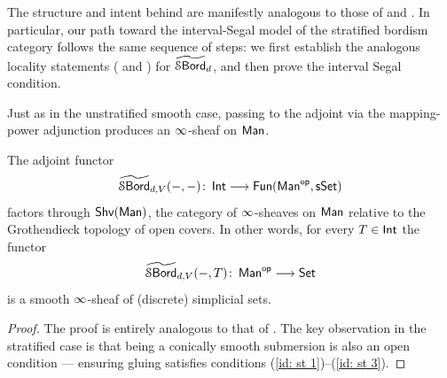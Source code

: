 \begin{observation}
    The structure and intent behind  are manifestly analogous to those of  and . In particular, our path toward the interval-Segal model of the stratified bordism category follows the same sequence of steps: we first establish the analogous locality statements ( and ) for $\operatorname{\widetilde{\mathcal S\mathsf{Bord}}}_d$, and then prove the interval Segal condition.
\end{observation}

Just as in the unstratified smooth case, passing to the adjoint via the mapping-power adjunction produces an $\operatorname{\infty}$-sheaf on $\operatorname{\sf Man}$.
\begin{proposition}\label{ch5:: prop: sheaf condition}
    The adjoint functor 
    \begin{equation}
    \operatorname{\widetilde{\mathcal S\mathsf{Bord}}}_{d,V}(-,-)\colon \operatorname{\mathsf{Int}} \longrightarrow \operatorname{{\sf Fun}}(\operatorname{\sf Man}^{\mathsf{op}},\operatorname{\sf sSet})
    \end{equation}
    factors through $\operatorname{\sf Shv}(\operatorname{\sf Man})$, the category of $\operatorname{\infty}$-sheaves on $\operatorname{\sf Man}$ relative to the Grothendieck topology of open covers. In other words, for every $T\in \operatorname{\mathsf{Int}}$ the functor
    \[
    \operatorname{\widetilde{\mathcal S\mathsf{Bord}}}_{d,V}(-,T)\colon \operatorname{\sf Man}^{\mathsf{op}}\longrightarrow \operatorname{{\mathsf{Set}}}
    \]
    is a smooth $\operatorname{\infty}$-sheaf of (discrete) simplicial sets.
\end{proposition}
\begin{proof}
    The proof is entirely analogous to that of . The key observation in the stratified case is that being a conically smooth submersion is also an open condition — ensuring gluing satisfies conditions (\ref{id: st 1})--(\ref{id: st 3}).
\end{proof}

